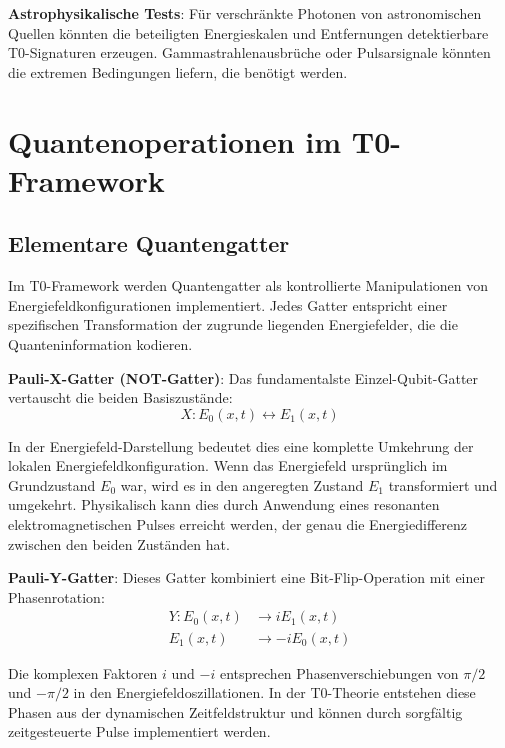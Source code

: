 \documentclass[12pt,a4paper]{article}
\theoremstyle{definition}
\theoremstyle{remark}
\begin{document}
\textbf{Astrophysikalische Tests}: F{\"u}r verschr{\"a}nkte Photonen von astronomischen Quellen k{\"o}nnten die beteiligten Energieskalen und Entfernungen detektierbare T0-Signaturen erzeugen. Gammastrahlenausbr{\"u}che oder Pulsarsignale k{\"o}nnten die extremen Bedingungen liefern, die ben{\"o}tigt werden.

\section{Quantenoperationen im T0-Framework}

\subsection{Elementare Quantengatter}

Im T0-Framework werden Quantengatter als kontrollierte Manipulationen von Energiefeldkonfigurationen implementiert. Jedes Gatter entspricht einer spezifischen Transformation der zugrunde liegenden Energiefelder, die die Quanteninformation kodieren.

\textbf{Pauli-X-Gatter (NOT-Gatter)}:
Das fundamentalste Einzel-Qubit-Gatter vertauscht die beiden Basiszust{\"a}nde:
\begin{equation}
	X: E_0(x,t) \leftrightarrow E_1(x,t)
	\label{eq:pauli_x_gate}
\end{equation}

In der Energiefeld-Darstellung bedeutet dies eine komplette Umkehrung der lokalen Energiefeldkonfiguration. Wenn das Energiefeld urspr{\"u}nglich im Grundzustand $E_0$ war, wird es in den angeregten Zustand $E_1$ transformiert und umgekehrt. Physikalisch kann dies durch Anwendung eines resonanten elektromagnetischen Pulses erreicht werden, der genau die Energiedifferenz zwischen den beiden Zust{\"a}nden hat.

\textbf{Pauli-Y-Gatter}:
Dieses Gatter kombiniert eine Bit-Flip-Operation mit einer Phasenrotation:
\begin{align}
	Y: E_0(x,t) &\rightarrow i E_1(x,t) \\
	E_1(x,t) &\rightarrow -i E_0(x,t)
\end{align}

Die komplexen Faktoren $i$ und $-i$ entsprechen Phasenverschiebungen von $\pi/2$ und $-\pi/2$ in den Energiefeldoszillationen. In der T0-Theorie entstehen diese Phasen aus der dynamischen Zeitfeldstruktur und k{\"o}nnen durch sorgf{\"a}ltig zeitgesteuerte Pulse implementiert werden.
\end{document}
